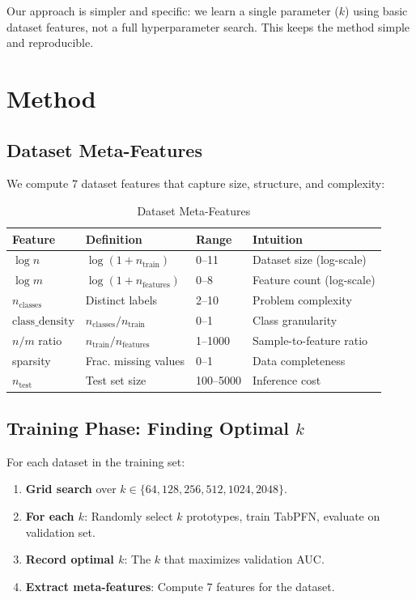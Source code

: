 \documentclass[11pt,a4paper]{article}
\begin{document}
Our approach is simpler and specific: we learn a single parameter ($k$) using basic dataset features, not a full hyperparameter search. This keeps the method simple and reproducible.

\section{Method}

\subsection{Dataset Meta-Features}

We compute 7 dataset features that capture size, structure, and complexity:

\begin{table}[h]
\centering
\caption{Dataset Meta-Features}
\label{tab:features}
\begin{tabular}{llll}
\toprule
Feature & Definition & Range & Intuition \\
\midrule
$\log n$ & $\log(1 + n_{\text{train}})$ & 0--11 & Dataset size (log-scale) \\
$\log m$ & $\log(1 + n_{\text{features}})$ & 0--8 & Feature count (log-scale) \\
$n_{\text{classes}}$ & Distinct labels & 2--10 & Problem complexity \\
$\text{class\_density}$ & $n_{\text{classes}} / n_{\text{train}}$ & 0--1 & Class granularity \\
$n/m$ ratio & $n_{\text{train}} / n_{\text{features}}$ & 1--1000 & Sample-to-feature ratio \\
sparsity & Frac. missing values & 0--1 & Data completeness \\
$n_{\text{test}}$ & Test set size & 100--5000 & Inference cost \\
\bottomrule
\end{tabular}
\end{table}

\subsection{Training Phase: Finding Optimal $k$}

For each dataset in the training set:

\begin{enumerate}
\item \textbf{Grid search} over $k \in \{64, 128, 256, 512, 1024, 2048\}$.

\item \textbf{For each $k$}: Randomly select $k$ prototypes, train TabPFN, evaluate on validation set.

\item \textbf{Record optimal $k$}: The $k$ that maximizes validation AUC.

\item \textbf{Extract meta-features}: Compute 7 features for the dataset.
\end{enumerate}
\end{document}
